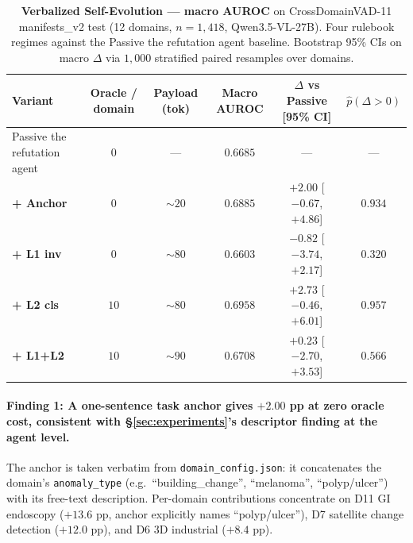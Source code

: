 \begin{table}[t]
\centering
\caption{\textbf{Verbalized Self-Evolution — macro AUROC} on
CrossDomainVAD-11 manifests\_v2 test (12 domains, $n{=}1{,}418$,
Qwen3.5-VL-27B). Four rulebook regimes against the Passive the refutation agent
baseline. Bootstrap 95\% CIs on macro $\Delta$ via $1{,}000$
stratified paired resamples over domains.}
\label{tab:verb_main}
\small
\setlength{\tabcolsep}{5pt}
\begin{tabular}{lccccc}
\toprule
Variant & Oracle / domain & Payload (tok) & Macro AUROC & $\Delta$ vs Passive [95\% CI] & $\hat{p}(\Delta{>}0)$ \\
\midrule
Passive the refutation agent & $0$ & --- & $0.6685$ & --- & --- \\
\textbf{+ Anchor}   & $0$  & $\sim 20$ & $0.6885$ & $+2.00$ [$-0.67$, $+4.86$] & $0.934$ \\
\textbf{+ L1 inv}   & $0$  & $\sim 80$ & $0.6603$ & $-0.82$ [$-3.74$, $+2.17$] & $0.320$ \\
\textbf{+ L2 cls}   & $10$ & $\sim 80$ & $\mathbf{0.6958}$ & $\mathbf{+2.73}$ [$-0.46$, $+6.01$] & $\mathbf{0.957}$ \\
\textbf{+ L1+L2}    & $10$ & $\sim 90$ & $0.6708$ & $+0.23$ [$-2.70$, $+3.53$] & $0.566$ \\
\bottomrule
\end{tabular}
\end{table}

\paragraph{Finding 1: A one-sentence task anchor gives $+2.00$ pp
at zero oracle cost, consistent with \S\ref{sec:experiments}'s
descriptor finding at the agent level.} The anchor is taken
verbatim from \texttt{domain\_config.json}: it concatenates the
domain's \texttt{anomaly\_type} (e.g.\ ``building\_change'',
``melanoma'', ``polyp/ulcer'') with its free-text description.
Per-domain contributions concentrate on D11 GI endoscopy
($+13.6$ pp, anchor explicitly names ``polyp/ulcer''), D7 satellite
change detection ($+12.0$ pp), and D6 3D industrial ($+8.4$ pp).

